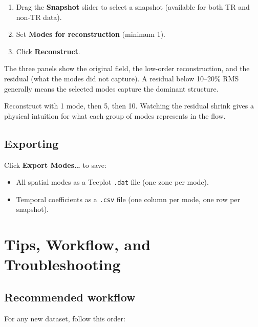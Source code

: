 \documentclass[11pt, a4paper]{report}
\newcommand{\uipth}[1]{\textbf{\textcolor{upblue}{#1}}}
\begin{document}
\begin{stepbox}
\begin{enumerate}[leftmargin=1.5em, topsep=2pt]
  \item Drag the \uipth{Snapshot} slider to select a snapshot (available for both TR and non-TR data).
  \item Set \uipth{Modes for reconstruction} (minimum 1).
  \item Click \uipth{Reconstruct}.
\end{enumerate}
\end{stepbox}

The three panels show the original field, the low-order reconstruction, and the residual (what the modes did not capture). A residual below 10--20\% RMS generally means the selected modes capture the dominant structure.

\begin{tipbox}
Reconstruct with 1 mode, then 5, then 10. Watching the residual shrink gives a physical intuition for what each group of modes represents in the flow.
\end{tipbox}

\section{Exporting}

Click \uipth{Export Modes\ldots} to save:
\begin{itemize}[leftmargin=1.5em]
  \item All spatial modes as a Tecplot \texttt{.dat} file (one zone per mode).
  \item Temporal coefficients as a \texttt{.csv} file (one column per mode, one row per snapshot).
\end{itemize}

\chapter{Tips, Workflow, and Troubleshooting}

\section{Recommended workflow}

For any new dataset, follow this order:
\end{document}

